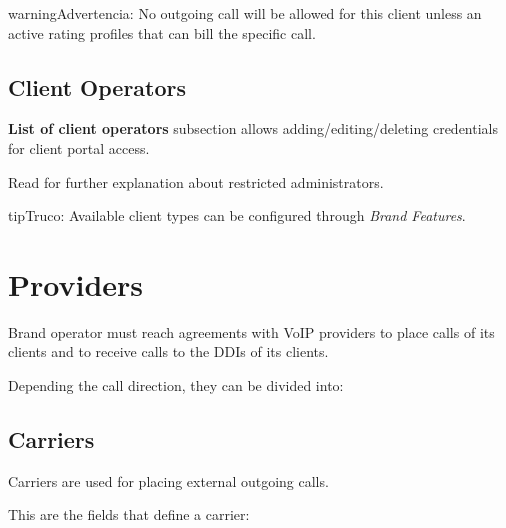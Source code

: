 \documentclass[letterpaper,10pt,spanish]{sphinxmanual}
\begin{document}
\begin{notice}{warning}{Advertencia:}
No outgoing call will be allowed for this client unless an active rating profiles that can
bill the specific call.
\end{notice}


\subsection{Client Operators}
\label{administration_portal/brand/clients/operators::doc}\label{administration_portal/brand/clients/operators:client-operators}\label{administration_portal/brand/clients/operators:id1}
\textbf{List of client operators} subsection allows adding/editing/deleting credentials for client portal access.

Read {\hyperref[api_rest/acls:acls]{}} for further explanation about restricted administrators.

\begin{notice}{tip}{Truco:}
Available client types can be configured through \emph{Brand Features}.
\end{notice}


\section{Providers}
\label{administration_portal/brand/providers/index::doc}\label{administration_portal/brand/providers/index:providers}
Brand operator must reach agreements with VoIP providers to place calls of its clients and to receive calls to the
DDIs of its clients.

Depending the call direction, they can be divided into:


\subsection{Carriers}
\label{administration_portal/brand/providers/carriers:id1}\label{administration_portal/brand/providers/carriers::doc}\label{administration_portal/brand/providers/carriers:carriers}
Carriers are used for placing external outgoing calls.

This are the fields that define a carrier:
\end{document}
